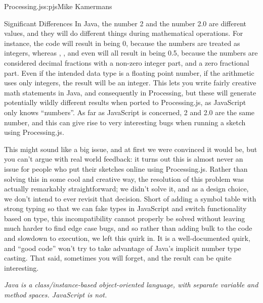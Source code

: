 \begin{aosachapter}{Processing.js}{s:pjs}{Mike Kamermans}
\begin{aosasect1}{Significant Differences}
In Java, the number 2 and the number 2.0 are different values, and
they will do different things during mathematical operations. For
instance, the code  will result in  being 0,
because the numbers are treated as integers, whereas ,
, and even  will all result in
 being 0.5, because the numbers are considered decimal
fractions with a non-zero integer part, and a zero fractional part. Even if
the intended data type is a floating point number, if the arithmetic
uses only integers, the result will be an integer. This lets you write
fairly creative math statements in Java, and consequently in
Processing, but these will generate potentially wildly different
results when ported to Processing.js, as JavaScript only knows
``numbers''. As far as JavaScript is concerned, 2 and 2.0 are the same
number, and this can give rise to very interesting bugs when running a
sketch using Processing.js.

This might sound like a big issue, and at first we were convinced it
would be, but you can't argue with real world feedback: it turns out
this is almost never an issue for people who put their sketches online
using Processing.js. Rather than solving this in some cool and
creative way, the resolution of this problem was actually remarkably
straightforward; we didn't solve it, and as a design choice, we don't
intend to ever revisit that decision. Short of adding a symbol table
with strong typing so that we can fake types in JavaScript and switch
functionality based on type, this incompatibility cannot properly be
solved without leaving much harder to find edge case bugs, and so
rather than adding bulk to the code and slowdown to execution, we left
this quirk in. It is a well-documented quirk, and ``good code'' won't
try to take advantage of Java's implicit number type casting. That
said, sometimes you will forget, and the result can be quite
interesting.

\emph{Java is a class/instance-based object-oriented language, with separate variable and method spaces. JavaScript is not.}


\end{aosasect1}
\end{aosachapter}
